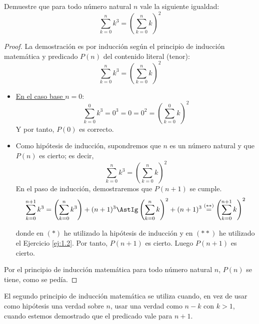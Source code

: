 \begin{ejercicio}
    Demuestre que para todo número natural $n$ vale la siguiente igualdad:
    $$\sum_{k=0}^n k^3 = \left(\sum_{k=0}^n k\right)^2$$
\begin{proof}
    La demostración es por inducción según el principio de inducción matemática y predicado $P(n)$ del contenido literal (tenor):
    $$\sum_{k=0}^n k^3 = \left(\sum_{k=0}^n k\right)^2$$
    \begin{itemize}
        \item \ul{En el caso base $n = 0$}:
        $$\sum_{k=0}^0 k^3 = 0^3 = 0 = 0^2 = \left(\sum_{k=0}^0 k\right)^2$$
        Y por tanto, $P(0)$ es correcto.
        
        \item Como hipótesis de inducción, supondremos que $n$ es un número natural y que $P(n)$ es cierto; es decir, 
        $$\sum_{k=0}^{n} k^3 = \left(\sum_{k=0}^n k\right)^2$$
        En el paso de inducción, demostraremos que $P(n+1)$ se cumple.
        $$\sum_{k=0}^{n+1} k^3 = \left(\sum_{k=0}^n k^3\right) + (n+1)^3 \AstIg \left(\sum_{k=0}^n k\right)^2 + (n+1)^3 \stackrel{(\ast\ast)}{=} \left(\sum_{k=0}^{n+1} k\right)^2  $$

        donde en $(\ast)$ he utilizado la hipótesis de inducción y en $(\ast\ast)$ he utilizado el Ejercicio \ref{ej:1.2}. Por tanto, $P(n+1)$ es cierto.
        Luego $P(n+1)$ es cierto.
    \end{itemize}
    Por el principio de inducción matemática para todo número natural $n$, $P(n)$ se tiene, como se pedía.
\end{proof}
\end{ejercicio}

\begin{observacion}
    El segundo principio de inducción matemática se utiliza cuando, en vez de usar como hipótesis una verdad sobre $n$, usar una verdad como $n-k$ con $k >1$, cuando estemos demostrado que el predicado vale para $n+1$.
\end{observacion}

